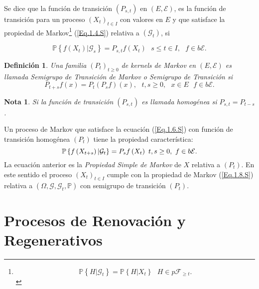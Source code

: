 \documentclass{article}
\newtheorem{Def}{Definición}[section]
\newtheorem{Note}{Nota}[section]
\newcommand{\prob}{\mathbb{P}}
\newcommand{\ER}{\left(E,\mathcal{E}\right)}
\newcommand{\KM}{\left(P_{s,t}\right)}
\newcommand{\PE}{\left(X_{t}\right)_{t\in I}}
\numberwithin{equation}{section}
\begin{document}
Se dice que la funci\'on de transici\'on $\KM$ en $\ER$, es la funci\'on de transici\'on para un proceso $\PE$  con valores en $E$ y que satisface la propiedad de Markov\footnote{\begin{equation}\label{Eq.1.4.S}
\prob\left\{H|\mathcal{G}_{t}\right\}=\prob\left\{H|X_{t}\right\}\textrm{ }H\in p\mathcal{F}_{\geq t}.
\end{equation}} (\ref{Eq.1.4.S}) relativa a $\left(\mathcal{G}_{t}\right)$, si

\begin{equation}\label{Eq.1.6.S}
\prob\left\{f\left(X_{t}\right)|\mathcal{G}_{s}\right\}=P_{s,t}f\left(X_{t}\right)\textrm{ }s\leq t\in I,\textrm{ }f\in b\mathcal{E}.
\end{equation}

\begin{Def}
Una familia $\left(P_{t}\right)_{t\geq0}$ de kernels de Markov en $\ER$ es llamada {\em Semigrupo de Transici\'on de Markov} o {\em Semigrupo de Transici\'on} si
\[P_{t+s}f\left(x\right)=P_{t}\left(P_{s}f\right)\left(x\right),\textrm{ }t,s\geq0,\textrm{ }x\in E\textrm{ }f\in b\mathcal{E}.\]
\end{Def}
\begin{Note}
Si la funci\'on de transici\'on $\KM$ es llamada homog\'enea si $P_{s,t}=P_{t-s}$.
\end{Note}

Un proceso de Markov que satisface la ecuaci\'on (\ref{Eq.1.6.S}) con funci\'on de transici\'on homog\'enea $\left(P_{t}\right)$ tiene la propiedad caracter\'istica:
\begin{equation}\label{Eq.1.8.S}\index{Propiedad Simple de Markov}
\prob\left\{f\left(X_{t+s}\right)|\mathcal{G}_{t}\right\}=P_{s}f\left(X_{t}\right)\textrm{ }t,s\geq0,\textrm{ }f\in b\mathcal{E}.
\end{equation}
La ecuaci\'on anterior es la {\em Propiedad Simple de Markov} de $X$ relativa a $\left(P_{t}\right)$. En este sentido el proceso $\PE$ cumple con la propiedad de Markov (\ref{Eq.1.8.S}) relativa a $\left(\Omega,\mathcal{G},\mathcal{G}_{t},\prob\right)$ con semigrupo de transici\'on $\left(P_{t}\right)$.

\section{Procesos de Renovaci\'on y Regenerativos}
\end{document}
